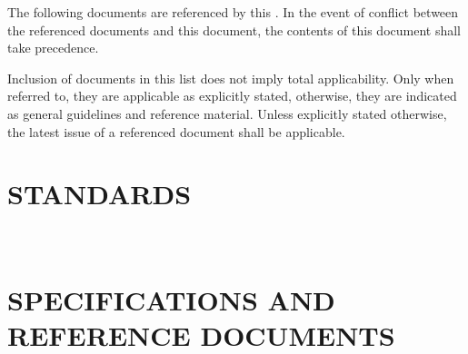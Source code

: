 
\label{sec:References}

The following documents are referenced by this \DocType{}. In the event of conflict between the referenced documents and this document, the contents of this document shall take precedence.

Inclusion of documents in this list does not imply total applicability. Only when referred to, they are applicable as explicitly stated, otherwise, they are indicated as general guidelines and reference material.
Unless explicitly stated otherwise, the latest issue of a referenced document shall be applicable.


\section*{STANDARDS}
\label{sec:standardsBLkey}


\printStandardsBiblio

\ \\
\section*{SPECIFICATIONS AND REFERENCE DOCUMENTS}
\label{sec:specmilrBLkey}
\label{sec:combBLkey}


\printReferencesBiblio
